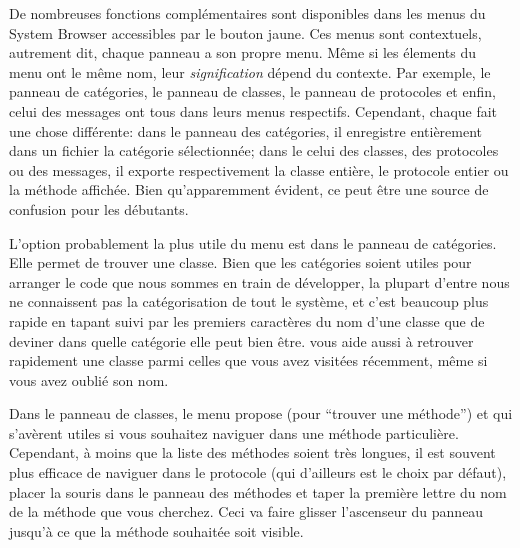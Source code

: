 \documentclass[a4paper,10pt,twoside]{book}
\begin{document}
De nombreuses fonctions compl\'ementaires sont disponibles dans les menus du
System Browser accessibles par le bouton jaune. Ces menus sont contextuels, 
autrement dit, chaque panneau a son propre menu.
M\^eme si les \'elements du menu ont le m\^eme nom, leur \emph{signification}
d\'epend du contexte. Par exemple, le panneau de cat\'egories, le
panneau de classes, le panneau de protocoles et enfin, celui des messages
ont tous  dans leurs menus respectifs. Cependant, chaque 
 fait une chose diff\'erente: dans le panneau des cat\'egories,
il enregistre enti\`erement dans un fichier la cat\'egorie s\'electionn\'ee; dans le celui des classes, des protocoles ou des messages, il exporte respectivement la classe enti\`ere, le protocole entier ou la m\'ethode affich\'ee.
Bien qu'apparemment \'evident, ce peut \^etre une source de confusion pour
les d\'ebutants. 

L'option probablement la plus utile du menu est  
dans le panneau de cat\'egories. 
Elle permet de trouver une classe.  
Bien que les cat\'egories soient utiles pour arranger le code que nous 
sommes en train de d\'evelopper, la plupart d'entre nous ne connaissent pas
la cat\'egorisation de tout le syst\`eme, et c'est beaucoup plus rapide
en tapant  suivi par les premiers caract\`eres du nom d'une 
classe que de deviner dans quelle cat\'egorie elle peut bien \^etre.
 vous aide aussi \`a retrouver rapidement
une classe parmi celles que vous avez visit\'ees r\'ecemment, m\^eme si vous
avez oubli\'e son nom.

Dans le panneau de classes, le menu propose  (pour ``trouver
une m\'ethode'') et
 qui s'av\`erent utiles si vous souhaitez
naviguer dans une m\'ethode particuli\`ere. Cependant, 
\`a moins que la liste des m\'ethodes soient tr\`es longues, il est souvent
plus efficace de naviguer dans le protocole  
(qui d'ailleurs est le choix par d\'efaut), placer la souris dans le
panneau des m\'ethodes et taper la premi\`ere lettre du nom de la m\'ethode
que vous cherchez.
Ceci va faire glisser l'ascenseur du panneau jusqu'\`a ce que la m\'ethode souhait\'ee soit visible.

\end{document}
